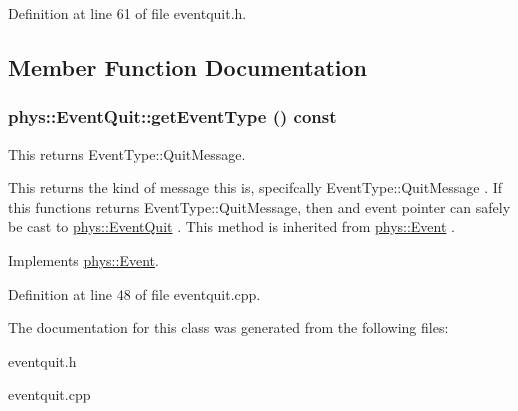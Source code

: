 Definition at line 61 of file eventquit.h.



\subsection{Member Function Documentation}
\hypertarget{classphys_1_1EventQuit_a4df44098d0ef838db55a8e2a016d0724}{
\subsubsection[{getEventType}]{ phys::EventQuit::getEventType () const}}
\label{dd/dea/classphys_1_1EventQuit_a4df44098d0ef838db55a8e2a016d0724}


This returns EventType::QuitMessage. 

This returns the kind of message this is, specifcally EventType::QuitMessage . If this functions returns EventType::QuitMessage, then and event pointer can safely be cast to \hyperlink{classphys_1_1EventQuit}{phys::EventQuit} . This method is inherited from \hyperlink{classphys_1_1Event}{phys::Event} . 

Implements \hyperlink{classphys_1_1Event_ac2c0623a6bc399e62f4b9fb2c022ea73}{phys::Event}.



Definition at line 48 of file eventquit.cpp.



The documentation for this class was generated from the following files:\begin{DoxyCompactItemize}
\item 
eventquit.h\item 
eventquit.cpp\end{DoxyCompactItemize}
